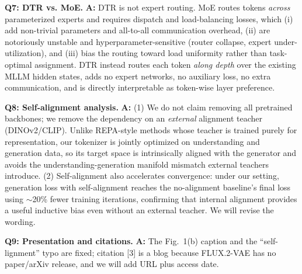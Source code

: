 \documentclass[10pt,twocolumn,letterpaper]{article}
\newcommand{\Rone}[1]{\textcolor{rOneColor}{#1}}
\newcommand{\Rtwo}[1]{\textcolor{rTwoColor}{#1}}
\newcommand{\Qtext}[1]{\textcolor{questionColor}{#1}}
\begin{document}
\noindent[\textit{\Rtwo{F1M7}}.] \textbf{\Qtext{Q7: DTR vs. MoE.}} \textbf{\Qtext{A:}} DTR is not expert routing. MoE routes tokens \emph{across} parameterized experts and requires dispatch and load-balancing losses, which (i) add non-trivial parameters and all-to-all communication overhead, (ii) are notoriously unstable and hyperparameter-sensitive (router collapse, expert under-utilization), and (iii) bias the routing toward load uniformity rather than task-optimal assignment. DTR instead routes each token \emph{along depth} over the existing MLLM hidden states, adds no expert networks, no auxiliary loss, no extra communication, and is directly interpretable as token-wise layer preference.

\noindent[\textit{\Rtwo{F1M7}}.] \textbf{\Qtext{Q8: Self-alignment analysis.}} \textbf{\Qtext{A:}} (1) We do not claim removing all pretrained backbones; we remove the dependency on an \emph{external} alignment teacher (DINOv2/CLIP). Unlike REPA-style methods whose teacher is trained purely for representation, our tokenizer is jointly optimized on understanding and generation data, so its target space is intrinsically aligned with the generator and avoids the understanding-generation manifold mismatch external teachers introduce. (2) Self-alignment also accelerates convergence: under our setting, generation loss with self-alignment reaches the no-alignment baseline's final loss using $\sim$20\% fewer training iterations, confirming that internal alignment provides a useful inductive bias even without an external teacher. We will revise the wording.

\noindent[\textit{\Rone{XtYZ}}.] \textbf{\Qtext{Q9: Presentation and citations.}} \textbf{\Qtext{A:}} The Fig.~1(b) caption and the ``self-lignment'' typo are fixed; citation [3] is a blog because FLUX.2-VAE has no paper/arXiv release, and we will add URL plus access date.
\end{document}
